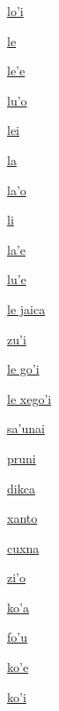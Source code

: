 {\hyperlink{val:lohi}{lo'i}}{}{}{}

{\hyperlink{val:le}{le}}{}{}{}

{\hyperlink{val:lehe}{le'e}}{}{}{}

{\hyperlink{val:luho}{lu'o}}{}{}{}

{\hyperlink{val:lei}{lei}}{}{}{}

{\hyperlink{val:la}{la}}{}{}{}

{\hyperlink{val:laho}{la'o}}{}{}{}

{\hyperlink{val:li}{li}}{}{}{}

{\hyperlink{val:lahe}{la'e}}{}{}{}

{\hyperlink{val:luhe}{lu'e}}{}{}{}

{\hyperlink{val:le jaica}{le jaica}}{}{}{}

{\hyperlink{val:zuhi}{zu'i}}{}{}{}

{\hyperlink{val:le gohi}{le go'i}}{}{}{}

{\hyperlink{val:le xegohi}{le xego'i}}{}{}{}

{\hyperlink{val:sahunai}{sa'unai}}{}{}{}

{\hyperlink{val:pruni}{pruni}}{}{}{}

{\hyperlink{val:dikca}{dikca}}{}{}{}

{\hyperlink{val:xanto}{xanto}}{}{}{}

{\hyperlink{val:cuxna}{cuxna}}{}{}{}

{\hyperlink{val:ziho}{zi'o}}{}{}{}

{\hyperlink{val:koha}{ko'a}}{}{}{}

{\hyperlink{val:fohu}{fo'u}}{}{}{}

{\hyperlink{val:kohe}{ko'e}}{}{}{}

{\hyperlink{val:kohi}{ko'i}}{}{}{}

